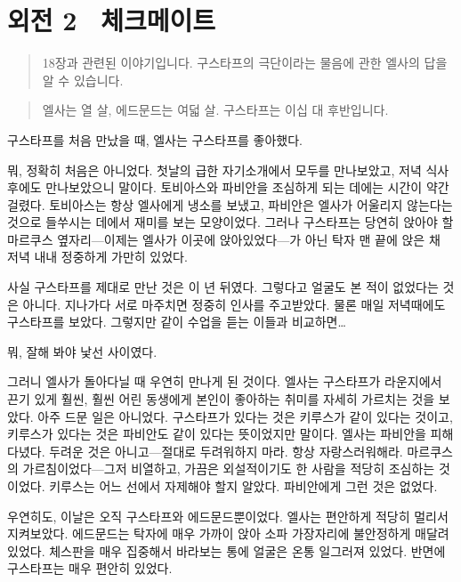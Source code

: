 

\chapter[외전2. 체크메이트][외전 2\hspace*{.5em}체크메이트]{외전 2 \ 체크메이트}



\begin{quote}

\small 18장과 관련된 이야기입니다. 구스타프의 극단이라는 물음에 관한 엘사의 답을 알 수 있습니다.

\end{quote}

\begin{quote}

\small 엘사는 열 살, 에드문드는 여덟 살. 구스타프는 이십 대 후반입니다.

\end{quote}구스타프를 처음 만났을 때, 엘사는 구스타프를 좋아했다.

뭐, 정확히 처음은 아니었다. 첫날의 급한 자기소개에서 모두를 만나보았고, 저녁 식사 후에도 만나보았으니 말이다. 토비아스와 파비안을 조심하게 되는 데에는 시간이 약간 걸렸다. 토비아스는 항상 엘사에게 냉소를 보냈고, 파비안은 엘사가 어울리지 않는다는 것으로 들쑤시는 데에서 재미를 보는 모양이었다. 그러나 구스타프는 당연히 앉아야 할 마르쿠스 옆자리—이제는 엘사가 이곳에 앉아있었다—가 아닌 탁자 맨 끝에 앉은 채 저녁 내내 정중하게 가만히 있었다.

사실 구스타프를 제대로 만난 것은 이 년 뒤였다. 그렇다고 얼굴도 본 적이 없었다는 것은 아니다. 지나가다 서로 마주치면 정중히 인사를 주고받았다. 물론 매일 저녁때에도 구스타프를 보았다. 그렇지만 같이 수업을 듣는 이들과 비교하면\ldots

뭐, 잘해 봐야 낯선 사이였다.

그러니 엘사가 돌아다닐 때 우연히 만나게 된 것이다. 엘사는 구스타프가 라운지에서 끈기 있게 훨씬, 훨씬 어린 동생에게 본인이 좋아하는 취미를 자세히 가르치는 것을 보았다. 아주 드문 일은 아니었다. 구스타프가 있다는 것은 키루스가 같이 있다는 것이고, 키루스가 있다는 것은 파비안도 같이 있다는 뜻이었지만 말이다. 엘사는 파비안을 피해 다녔다. 두려운 것은 아니고—절대로 두려워하지 마라. 항상 자랑스러워해라. 마르쿠스의 가르침이었다—그저 비열하고, 가끔은 외설적이기도 한 사람을 적당히 조심하는 것이었다. 키루스는 어느 선에서 자제해야 할지 알았다. 파비안에게 그런 것은 없었다.

우연히도, 이날은 오직 구스타프와 에드문드뿐이었다. 엘사는 편안하게 적당히 멀리서 지켜보았다. 에드문드는 탁자에 매우 가까이 앉아 소파 가장자리에 불안정하게 매달려 있었다. 체스판을 매우 집중해서 바라보는 통에 얼굴은 온통 일그러져 있었다. 반면에 구스타프는 매우 편안히 있었다.

